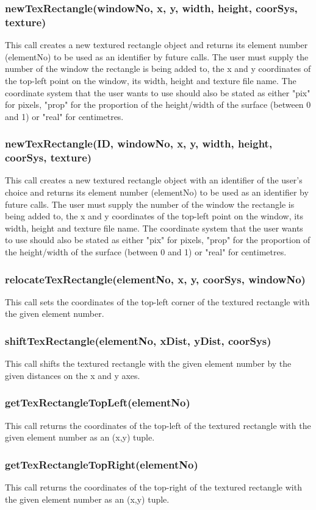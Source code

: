 \documentclass{acm_proc_article-sp}
\begin{document}
\subsubsection{newTexRectangle(windowNo, x, y, width, height, coorSys, texture)}
This call creates a new textured rectangle object and returns its element number (elementNo) to be used as an identifier by future calls. The user must supply the number of the window the rectangle is being added to, the x and y coordinates of the top-left point on the window, its width, height and texture file name. The coordinate system that the user wants to use should also be stated as either "pix" for pixels, "prop" for the proportion of the height/width of the surface (between 0 and 1) or "real" for centimetres.
\subsubsection{newTexRectangle(ID, windowNo, x, y, width, height, coorSys, texture)}
This call creates a new textured rectangle object with an identifier of the user's choice and returns its element number (elementNo) to be used as an identifier by future calls. The user must supply the number of the window the rectangle is being added to, the x and y coordinates of the top-left point on the window, its width, height and texture file name. The coordinate system that the user wants to use should also be stated as either "pix" for pixels, "prop" for the proportion of the height/width of the surface (between 0 and 1) or "real" for centimetres.
\subsubsection{relocateTexRectangle(elementNo, x, y, coorSys, windowNo)}
This call sets the coordinates of the top-left corner of the textured rectangle with the given element number.
\subsubsection{shiftTexRectangle(elementNo, xDist, yDist, coorSys)}
This call shifts the textured rectangle with the given element number by the given distances on the x and y axes.
\subsubsection{getTexRectangleTopLeft(elementNo)}
This call returns the coordinates of the top-left of the textured rectangle with the given element number as an (x,y) tuple.
\subsubsection{getTexRectangleTopRight(elementNo)}
This call returns the coordinates of the top-right of the textured rectangle with the given element number as an (x,y) tuple.
\end{document}
